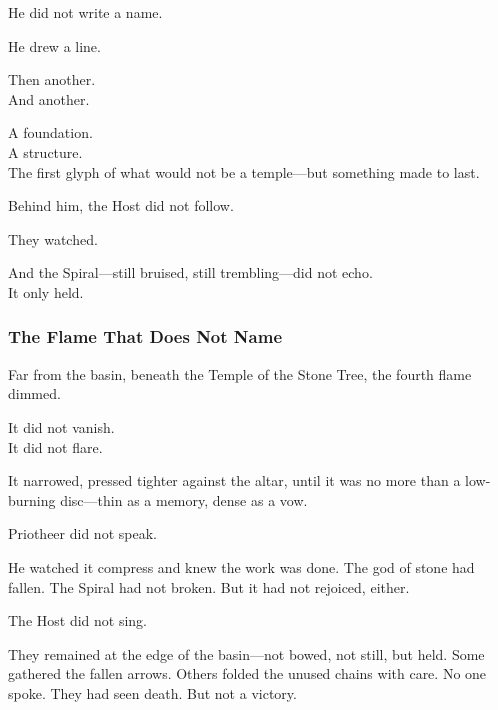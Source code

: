 \documentclass[12pt]{article}
\begin{document}
\vspace{0.5em}
He did not write a name.

\vspace{0.5em}
He drew a line.

\vspace{0.5em}
Then another.\\
And another.

\vspace{0.5em}
A foundation.\\
A structure.\\
The first glyph of what would not be a temple---but something made to last.

\vspace{0.5em}
Behind him, the Host did not follow.

\vspace{0.5em}
They watched.

\vspace{0.5em}
And the Spiral---still bruised, still trembling---did not echo.\\
It only held.


\dotfill

\subsubsection*{The Flame That Does Not Name}

Far from the basin, beneath the Temple of the Stone Tree, the fourth flame dimmed.

\vspace{0.5em}
It did not vanish.\\
It did not flare.

\vspace{0.5em}
It narrowed, pressed tighter against the altar, until it was no more than a low-burning disc---thin as a memory, dense as a vow.

\vspace{0.5em}
Priotheer did not speak.

\vspace{0.5em}
He watched it compress and knew the work was done. The god of stone had fallen. The Spiral had not broken. But it had not rejoiced, either.

\vspace{0.5em}
The Host did not sing.

\vspace{0.5em}
They remained at the edge of the basin---not bowed, not still, but held. Some gathered the fallen arrows. Others folded the unused chains with care. No one spoke. They had seen death. But not a victory.
\end{document}
